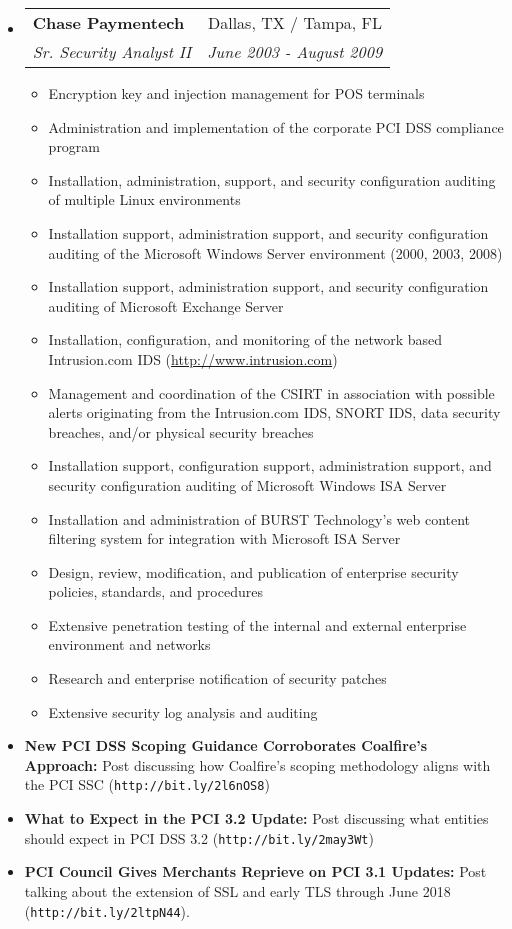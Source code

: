 \documentclass[letterpaper,11pt]{article}
\makeatletter
\newlength{\outerbordwidth}
\newcommand{\resitem}[1]{\item #1 \vspace{-2pt}}
\newcommand{\resheading}[1]{\vspace{8pt}
  \parbox{\textwidth}{\setlength{\FrameSep}{\outerbordwidth}
    \begin{shaded}

\setlength{\fboxsep}{0pt}\framebox[\textwidth][l]{\setlength{\fboxsep}{4pt}\fcolorbox{shadecolorB}{shadecolorB}{\textbf{\sffamily{\mbox{~}\makebox[6.762in][l]{\large #1} \vphantom{p\^{E}}}}}}
    \end{shaded}
  }\vspace{-5pt}
}
\newcommand{\ressubheading}[4]{
\begin{tabular*}{6.5in}{l@{\cftdotfill{\cftsecdotsep}\extracolsep{\fill}}r}
		\textbf{#1} & #2 \\
		\textit{#3} & \textit{#4} \\
\end{tabular*}\vspace{-6pt}}
\makeatother
\begin{document}
\begin{itemize}
\item 
	\ressubheading{Chase Paymentech}{Dallas, TX / Tampa, FL}{Sr. Security Analyst II}{June 2003 - August 2009}
	\begin{itemize}
	\resitem{Encryption key and injection management for POS terminals}
	\resitem{Administration and implementation of the corporate PCI DSS compliance program}
    \resitem{Installation, administration, support, and security configuration auditing of multiple Linux environments}
    \resitem{Installation support, administration support, and security configuration auditing of the Microsoft Windows Server environment (2000, 2003, 2008)}
    \resitem{Installation support, administration support, and security configuration auditing of Microsoft Exchange Server}
    \resitem{Installation, configuration, and monitoring of the network based Intrusion.com IDS (\url{http://www.intrusion.com})}
    \resitem{Management and coordination of the CSIRT in association with possible alerts originating from the Intrusion.com IDS, SNORT IDS, data security breaches, and/or physical security breaches}
    \resitem{Installation support, configuration support, administration support, and security configuration auditing of Microsoft Windows ISA Server}
    \resitem{Installation and administration of BURST Technology’s web content filtering system for integration with Microsoft ISA Server}
    \resitem{Design, review, modification, and publication of enterprise security policies, standards, and procedures}
    \resitem{Extensive penetration testing of the internal and external enterprise environment and networks}
    \resitem{Research and enterprise notification of security patches}
    \resitem{Extensive security log analysis and auditing}
	\end{itemize}

\end{itemize}

\resheading{Publications}

\begin{itemize}

\item {\bf New PCI DSS Scoping Guidance Corroborates Coalfire’s Approach:} Post discussing how Coalfire's scoping methodology aligns with the PCI SSC  (\texttt{http://bit.ly/2l6nOS8})
\item {\bf What to Expect in the PCI 3.2 Update:} Post discussing what entities should expect in PCI DSS 3.2 (\texttt{http://bit.ly/2may3Wt})
\item {\bf PCI Council Gives Merchants Reprieve on PCI 3.1 Updates:} Post talking about the extension of SSL and early TLS through June 2018 (\texttt{http://bit.ly/2ltpN44}).

\end{itemize}

\begin{comment}


\resheading{Skills}


\begin{itemize}

\item {\bf Place holder}

\end{itemize}

\end{comment}
\end{document}
